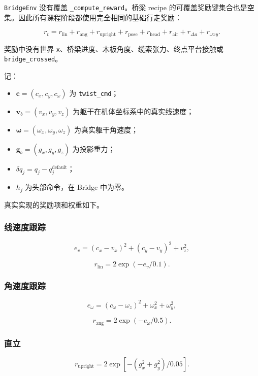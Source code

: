 \documentclass[
  chinese,
  11pt,
  letterpaper,
]{article}
\providecommand{\tightlist}{%
  \setlength{\itemsep}{0pt}\setlength{\parskip}{0pt}}
\begin{document}
\texttt{BridgeEnv} 没有覆盖
\texttt{\_\allowbreak{}compute\_\allowbreak{}reward}。桥梁 recipe
的可覆盖奖励键集合也是空集。因此所有课程阶段都使用完全相同的基础行走奖励：

\[
r_t=
r_{\text{lin}}+
r_{\text{ang}}+
r_{\text{upright}}+
r_{\text{pose}}+
r_{\text{head}}+
r_{\text{air}}+
r_{\Delta a}+
r_{\omega xy}.
\]

奖励中没有世界 \texttt{x}、桥梁进度、木板角度、缆索张力、终点平台接触或
\texttt{bridge\_\allowbreak{}crossed}。

记：

\begin{itemize}
\tightlist
\item
  \(\mathbf c=(c_x,c_y,c_\omega)\) 为 \texttt{twist\_cmd}；
\item
  \(\mathbf v_b=(v_x,v_y,v_z)\) 为躯干在机体坐标系中的真实线速度；
\item
  \(\boldsymbol\omega=(\omega_x,\omega_y,\omega_z)\) 为真实躯干角速度；
\item
  \(\mathbf g_b=(g_x,g_y,g_z)\) 为投影重力；
\item
  \(\delta q_j=q_j-q_j^{\text{default}}\)；
\item
  \(h_j\) 为头部命令，在 Bridge 中为零。
\end{itemize}

真实实现的奖励项和权重如下。

\subsubsection{线速度跟踪}\label{ux7ebfux901fux5ea6ux8ddfux8e2a}

\[
e_v=(c_x-v_x)^2+(c_y-v_y)^2+v_z^2,
\]

\[
r_{\text{lin}}=2\exp(-e_v/0.1).
\]

\subsubsection{角速度跟踪}\label{ux89d2ux901fux5ea6ux8ddfux8e2a}

\[
e_\omega=(c_\omega-\omega_z)^2+\omega_x^2+\omega_y^2,
\]

\[
r_{\text{ang}}=2\exp(-e_\omega/0.5).
\]

\subsubsection{直立}\label{ux76f4ux7acb}

\[
r_{\text{upright}}
=2\exp[-(g_x^2+g_y^2)/0.05].
\]
\end{document}
